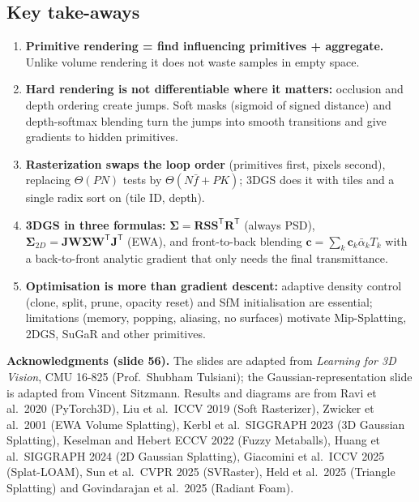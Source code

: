 \documentclass[11pt,a4paper]{article}
\newcommand{\T}{^{\mathsf T}}
\newcommand{\abar}{\bar\alpha}
\theoremstyle{definition}
\theoremstyle{plain}
\theoremstyle{remark}
\begin{document}
\subsection*{Key take-aways}
\begin{enumerate}
\item \textbf{Primitive rendering = find influencing primitives + aggregate.} Unlike volume rendering it does not waste samples in empty space.
\item \textbf{Hard rendering is not differentiable where it matters:} occlusion and depth ordering create jumps. Soft masks (sigmoid of signed distance) and depth-softmax blending turn the jumps into smooth transitions and give gradients to hidden primitives.
\item \textbf{Rasterization swaps the loop order} (primitives first, pixels second), replacing $\Theta(PN)$ tests by $\Theta(N\bar f+PK)$; 3DGS does it with tiles and a single radix sort on (tile ID, depth).
\item \textbf{3DGS in three formulas:} $\bm\Sigma=\bm R\bm S\bm S\T\bm R\T$ (always PSD), $\bm\Sigma_{2D}=\bm J\bm W\bm\Sigma\bm W\T\bm J\T$ (EWA), and front-to-back blending $\bm c=\sum_k\bm c_k\abar_kT_k$ with a back-to-front analytic gradient that only needs the final transmittance.
\item \textbf{Optimisation is more than gradient descent:} adaptive density control (clone, split, prune, opacity reset) and SfM initialisation are essential; limitations (memory, popping, aliasing, no surfaces) motivate Mip-Splatting, 2DGS, SuGaR and other primitives.
\end{enumerate}

\bigskip
\textbf{Acknowledgments (slide 56).} The slides are adapted from \emph{Learning for 3D Vision}, CMU 16-825 (Prof.\ Shubham Tulsiani); the Gaussian-representation slide is adapted from Vincent Sitzmann. Results and diagrams are from Ravi et al.\ 2020 (PyTorch3D), Liu et al.\ ICCV 2019 (Soft Rasterizer), Zwicker et al.\ 2001 (EWA Volume Splatting), Kerbl et al.\ SIGGRAPH 2023 (3D Gaussian Splatting), Keselman and Hebert ECCV 2022 (Fuzzy Metaballs), Huang et al.\ SIGGRAPH 2024 (2D Gaussian Splatting), Giacomini et al.\ ICCV 2025 (Splat-LOAM), Sun et al.\ CVPR 2025 (SVRaster), Held et al.\ 2025 (Triangle Splatting) and Govindarajan et al.\ 2025 (Radiant Foam).

\newpage

\setcounter{section}{0}
\renewcommand{\thesection}{\arabic{section}}
\end{document}
